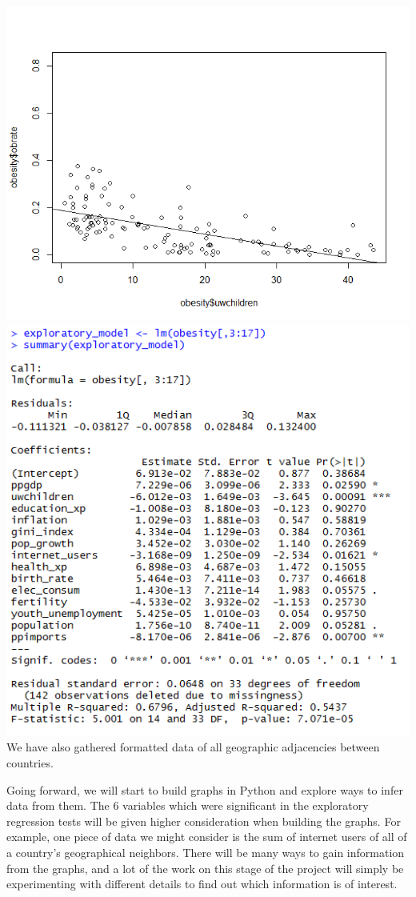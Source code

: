 \documentclass[oneside,12pt]{report}
\begin{document}
\includegraphics[width=\textwidth]{underweight_children.png}\\

\includegraphics[width=.75\textwidth]{multi_regression.png}\\

We have also gathered formatted data of all geographic adjacencies between countries.


Going forward, we will start to build graphs in Python and explore ways to infer data from them. The 6 variables which were significant in the exploratory regression tests will be given higher consideration when building the graphs. For example, one piece of data we might consider is the sum of internet users of all of a country's geographical neighbors. There will be many ways to gain information from the graphs, and a lot of the work on this stage of the project will simply be experimenting with different details to find out which information is of interest.
\end{document}
